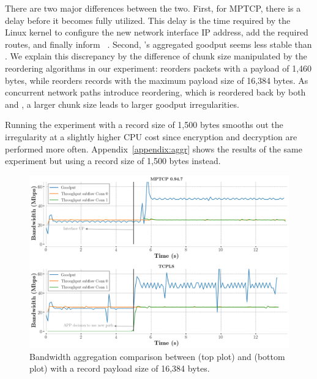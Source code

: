 There are two major differences between
the two. First, for MPTCP, there is a delay before it becomes fully utilized. 
This delay is the time required by the Linux kernel
to configure the new network interface IP address, add the required routes, and
finally inform \mptcp~\cite{paasch2012exploring}.
Second, \tcpls's aggregated goodput seems less stable than \mptcp. We explain 
this discrepancy by the difference of chunk size manipulated by the reordering 
algorithms in our experiment: \mptcp reorders packets with a payload of 1,460 
bytes, while \tcpls reorders records with the maximum 
payload size of 16,384 bytes. As concurrent network paths introduce reordering, 
which is reordered back by both \mptcp and \tcpls, a larger chunk size 
leads to larger goodput irregularities. 

Running the experiment with a record size 
of 1,500 bytes smooths out the irregularity at a slightly higher CPU cost since 
encryption and decryption are performed more often.
Appendix~\ref{appendix:aggr} shows the results of the same experiment but using
a \tls record size of 1,500 bytes instead.


\begin{figure}[!t]
  \begin{center}
    \includegraphics[width=\columnwidth]{figures/aggregate_dual.png}
  \end{center}
\vspace{-0.5cm}
  \caption{Bandwidth aggregation comparison between \mptcp (top plot) and
    \tcpls (bottom plot) with a record payload size of 16,384 bytes.}
  \label{fig:multipath_aggregation}
\end{figure}

